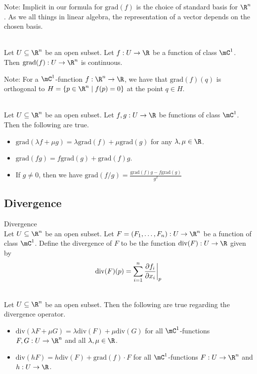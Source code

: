 \documentclass[a4paper]{article}
\begin{document}
Note: Implicit in our formula for $\text{grad}(f)$ is the choice of standard basis for $\R^n$. As we all things in linear algebra, the representation of a vector depends on the chosen basis. 

\begin{crl}{}{}\\
Let $U\subseteq\R^n$ be an open subset. Let $f:U\to\R$ be a function of class $\mC^1$. Then $\text{grad}(f):U\to\R^n$ is continuous. 
\end{crl}

Note: For a $\mC^1$-function $f:\R^n\to\R$, we have that $\text{grad}(f)(q)$ is orthogonal to $H=\{p\in\R^n\;|\;f(p)=0\}$ at the point $q\in H$. 

\begin{prp}{}{}\\
Let $U\subseteq\R^n$ be an open subset. Let $f,g:U\to\R$ be functions of class $\mC^1$. Then the following are true. 
\begin{itemize}
\item $\text{grad}(\lambda f+\mu g)=\lambda\text{grad}(f)+\mu\text{grad}(g)$ for any $\lambda,\mu\in\R$. 
\item $\text{grad}(fg)=f\text{grad}(g)+\text{grad}(f)g$. 
\item If $g\neq 0$, then we have $\text{grad}(f/g)=\frac{\text{grad}(f)g-f\text{grad}(g)}{g^2}$
\end{itemize}
\end{prp}

\subsection{Divergence}
\begin{defn}{Divergence}{}\\
Let $U\subseteq\R^n$ be an open subset. Let $F=(F_1,\dots,F_n):U\to\R^n$ be a function of class $\mC^1$. Define the divergence of $F$ to be the function $\text{div}(F):U\to\R$ given by $$\text{div}(F)(p)=\sum_{i=1}^n\frac{\partial f_i}{\partial x_i}\bigg{|}_p$$
\end{defn}

\begin{prp}{}{}\\
Let $U\subseteq\R^n$ be an open subset. Then the following are true regarding the divergence operator. 
\begin{itemize}
\item $\text{div}(\lambda F+\mu G)=\lambda\text{div}(F)+\mu\text{div}(G)$ for all $\mC^1$-functions $F,G:U\to\R^n$ and all $\lambda,\mu\in\R$. 
\item $\text{div}(hF)=h\text{div}(F)+\text{grad}(f)\cdot F$ for all $\mC^1$-functions $F:U\to\R^n$ and $h:U\to\R$. 
\end{itemize}
\end{prp}
\end{document}
